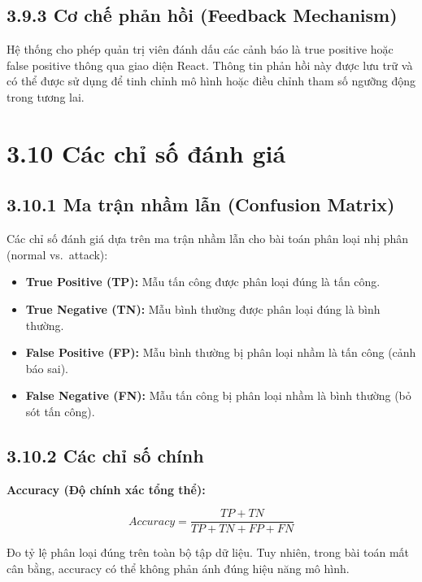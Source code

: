 \documentclass[
  a4paper]{report}
\providecommand{\tightlist}{%
  \setlength{\itemsep}{0pt}\setlength{\parskip}{0pt}}
\begin{document}
\subsection{3.9.3 Cơ chế phản hồi (Feedback
Mechanism)}\label{cux1a1-chux1ebf-phux1ea3n-hux1ed3i-feedback-mechanism}

Hệ thống cho phép quản trị viên đánh dấu các cảnh báo là true positive
hoặc false positive thông qua giao diện React. Thông tin phản hồi này
được lưu trữ và có thể được sử dụng để tinh chỉnh mô hình hoặc điều
chỉnh tham số ngưỡng động trong tương lai.

\section{3.10 Các chỉ số đánh
giá}\label{cuxe1c-chux1ec9-sux1ed1-ux111uxe1nh-giuxe1}

\subsection{3.10.1 Ma trận nhầm lẫn (Confusion
Matrix)}\label{ma-trux1eadn-nhux1ea7m-lux1eabn-confusion-matrix}

Các chỉ số đánh giá dựa trên ma trận nhầm lẫn cho bài toán phân loại nhị
phân (normal vs.~attack):

\begin{itemize}
\tightlist
\item
  \textbf{True Positive (TP):} Mẫu tấn công được phân loại đúng là tấn
  công.
\item
  \textbf{True Negative (TN):} Mẫu bình thường được phân loại đúng là
  bình thường.
\item
  \textbf{False Positive (FP):} Mẫu bình thường bị phân loại nhầm là tấn
  công (cảnh báo sai).
\item
  \textbf{False Negative (FN):} Mẫu tấn công bị phân loại nhầm là bình
  thường (bỏ sót tấn công).
\end{itemize}

\subsection{3.10.2 Các chỉ số
chính}\label{cuxe1c-chux1ec9-sux1ed1-chuxednh}

\textbf{Accuracy (Độ chính xác tổng thể):}

\[Accuracy = \frac{TP + TN}{TP + TN + FP + FN}\]

Đo tỷ lệ phân loại đúng trên toàn bộ tập dữ liệu. Tuy nhiên, trong bài
toán mất cân bằng, accuracy có thể không phản ánh đúng hiệu năng mô
hình.
\end{document}
